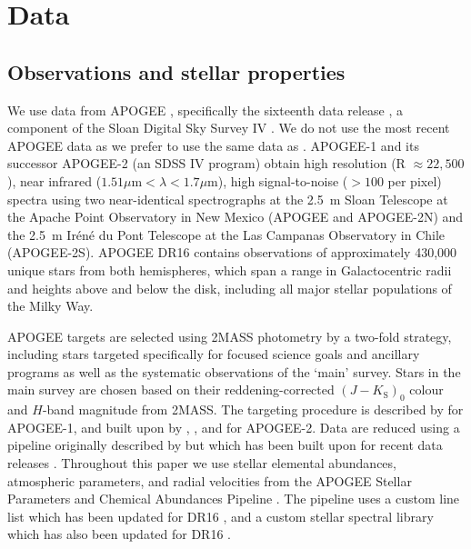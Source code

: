 \section{Data}
\label{ch3:sec:data}

\subsection{Observations and stellar properties}
\label{ch3:subsec:observations}

We use data from APOGEE \parencite{apogee}, specifically the sixteenth data release \parencite[DR16][]{sdssdr16}, a component of the Sloan Digital Sky Survey IV \parencite[SDSS][]{sdss4}. We do not use the most recent APOGEE data as we prefer to use the same data as \cite{lane22}. APOGEE-1 \parencite[an SDSS III program;][]{sdss3} and its successor APOGEE-2 (an SDSS IV program) obtain high resolution (R $\approx 22,500$), near infrared ($1.51 \mu\mathrm{m} < \lambda < 1.7 \mu\mathrm{m}$), high signal-to-noise ($> 100$ per pixel) spectra using two near-identical spectrographs \parencite{apogee_spectrographs} at the 2.5~m Sloan Telescope \parencite{gunn06} at the Apache Point Observatory in New Mexico (APOGEE and APOGEE-2N) and the 2.5~m Ir\'en\'e du Pont Telescope \parencite{bowen73a} at the Las Campanas Observatory in Chile (APOGEE-2S). APOGEE DR16 contains observations of approximately 430,000 unique stars from both hemispheres, which span a range in Galactocentric radii and heights above and below the disk, including all major stellar populations of the Milky Way.

APOGEE targets are selected using 2MASS \parencite{2mass} photometry by a two-fold strategy, including stars targeted specifically for focused science goals and ancillary programs as well as the systematic observations of the `main' survey. Stars in the main survey are chosen based on their reddening-corrected \parencite{majewski11} $(J-K_\mathrm{S})_{0}$ colour and $H$-band magnitude from 2MASS. The targeting procedure is described by \textcite{apogee_targeting} for APOGEE-1, and built upon by \textcite{apogee2_targeting}, \textcite{apogee2n_targeting}, and \textcite{apogee2s_targeting} for APOGEE-2. Data are reduced using a pipeline originally described by \textcite{apogee_pipeline} but which has been built upon for recent data releases \parencite{holtzman18,jonsson20}. Throughout this paper we use stellar elemental abundances, atmospheric parameters, and radial velocities from the APOGEE Stellar Parameters and Chemical Abundances Pipeline \parencite[ASPCAP,][]{aspcap}. The pipeline uses a custom line list \parencite{apogee_linelist} which has been updated for DR16 \parencite{apogeedr16_linelist}, and a custom stellar spectral library \parencite{apogee_speclib} which has also been updated for DR16 \parencite{jonsson20}.

